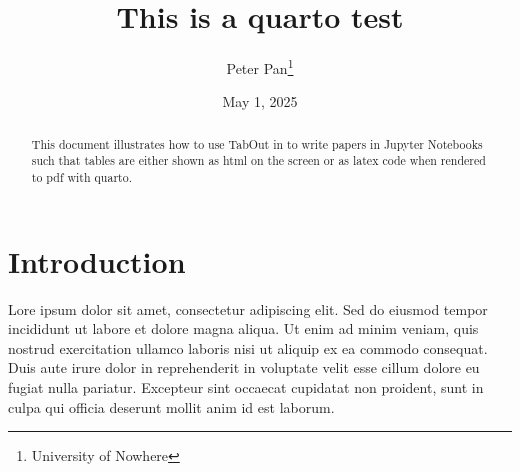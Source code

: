 \documentclass[
  11pt,
  a4paper,
  DIV=11,
  numbers=noendperiod]{scrartcl}
\title{This is a quarto test}
\author{Peter Pan\footnote{University of Nowhere}}
\date{May 1, 2025}
\begin{document}
\maketitle
\begin{abstract}
This document illustrates how to use TabOut in to write papers in
Jupyter Notebooks such that tables are either shown as html on the
screen or as latex code when rendered to pdf with quarto. \newpage
\end{abstract}


\onehalfspacing

\section{Introduction}\label{introduction}

Lore ipsum dolor sit amet, consectetur adipiscing elit. Sed do eiusmod
tempor incididunt ut labore et dolore magna aliqua. Ut enim ad minim
veniam, quis nostrud exercitation ullamco laboris nisi ut aliquip ex ea
commodo consequat. Duis aute irure dolor in reprehenderit in voluptate
velit esse cillum dolore eu fugiat nulla pariatur. Excepteur sint
occaecat cupidatat non proident, sunt in culpa qui officia deserunt
mollit anim id est laborum.

\begin{table}[H]

\caption{\label{tbl-1}The First Table}


\end{table}%
\end{document}
